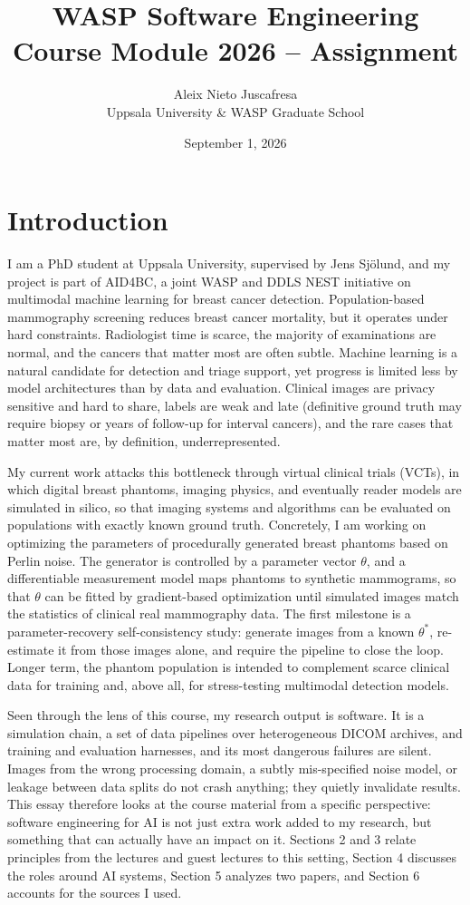 \documentclass[11pt,a4paper]{article}
\title{\Large \textbf{WASP Software Engineering Course Module 2026 -- Assignment}}
\author{Aleix Nieto Juscafresa\\ Uppsala University \& WASP Graduate School}
\date{September 1, 2026}
\begin{document}
\maketitle

\vspace{-10mm}
\section{Introduction}

I am a PhD student at Uppsala University, supervised by Jens Sj\"olund, and my project is part of AID4BC, a joint WASP and DDLS NEST initiative on multimodal machine learning for breast cancer detection. Population-based mammography screening reduces breast cancer mortality, but it operates under hard constraints. Radiologist time is scarce, the majority of examinations are normal, and the cancers that matter most are often subtle. Machine learning is a natural candidate for detection and triage support, yet progress is limited less by model architectures than by data and evaluation. Clinical images are privacy sensitive and hard to share, labels are weak and late (definitive ground truth may require biopsy or years of follow-up for interval cancers), and the rare cases that matter most are, by definition, underrepresented.

My current work attacks this bottleneck through virtual clinical trials (VCTs), in which digital breast phantoms, imaging physics, and eventually reader models are simulated in silico, so that imaging systems and algorithms can be evaluated on populations with exactly known ground truth. Concretely, I am working on optimizing the parameters of procedurally generated breast phantoms based on Perlin noise. The generator is controlled by a parameter vector $\theta$, and a differentiable measurement model maps phantoms to synthetic mammograms, so that $\theta$ can be fitted by gradient-based optimization until simulated images match the statistics of clinical real mammography data. The first milestone is a parameter-recovery self-consistency study: generate images from a known $\theta^{*}$, re-estimate it from those images alone, and require the pipeline to close the loop. Longer term, the phantom population is intended to complement scarce clinical data for training and, above all, for stress-testing multimodal detection models.

Seen through the lens of this course, my research output is software. It is a simulation chain, a set of data pipelines over heterogeneous DICOM archives, and training and evaluation harnesses, and its most dangerous failures are silent. Images from the wrong processing domain, a subtly mis-specified noise model, or leakage between data splits do not crash anything; they quietly invalidate results. This essay therefore looks at the course material from a specific perspective: software engineering for AI is not just extra work added to my research, but something that can actually have an impact on it. Sections 2 and 3 relate principles from the lectures and guest lectures to this setting, Section 4 discusses the roles around AI systems, Section 5 analyzes two papers, and Section 6 accounts for the sources I used.
\end{document}
